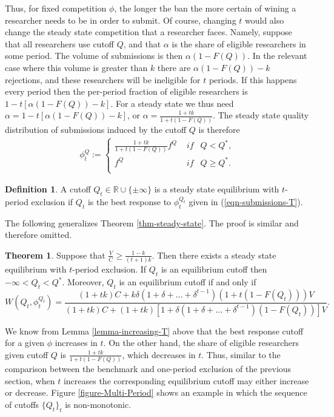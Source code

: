 \documentclass[12pt]{article}
\theoremstyle{plain}
\theoremstyle{definition}
\newtheorem{theorem}{Theorem}
\newtheorem{definition}{Definition}
\theoremstyle{remark}
\def\RR{\mathbb{R}}
\begin{document}
Thus, for fixed competition $\phi$, the longer the ban the more certain of wining a researcher needs to be in order to submit. Of course, changing $t$ would also change the steady state competition that a researcher faces. Namely, suppose that all researchers use cutoff $Q$, and that $\alpha$ is the share of eligible researchers in some period. The volume of submissions is then $\alpha(1-F(Q))$. In the relevant case where this volume is greater than $k$ there are $\alpha(1-F(Q))-k$ rejections, and these researchers will be ineligible for $t$ periods. If this happens every period then the per-period fraction of eligible researchers is $1-t[\alpha(1-F(Q))-k]$. For a steady state we thus need $\alpha = 1-t[\alpha(1-F(Q))-k]$, or $\alpha=\frac{1+tk}{1+t(1-F(Q))}$. The steady state quality distribution of submissions induced by the cutoff $Q$ is therefore  
\begin{eqnarray}\label{eqn-submissions-T}
\phi_t^Q:=
\left\{ \begin{array}{ll}
\frac{1+tk}{1+t(1-F(Q))}f^Q & \textit{ if } ~~ Q <Q^*,\\
f^Q & \textit{ if } ~~Q \ge Q^*.\\
\end{array} \right.
\end{eqnarray}

\begin{definition}\label{def-eq-with-bans-T}
A cutoff $Q_t\in \RR \cup \{\pm \infty\}$ is a steady state equilibrium with $t$-period exclusion if $Q_t$ is the best response to $\phi_t^{Q_t}$ given in (\ref{eqn-submissions-T}).
\end{definition}

The following generalizes Theorem \ref{thm-steady-state}. The proof is similar and therefore omitted.

\begin{theorem}\label{thm-steady-state-T}
    Suppose that $\frac{V}{C}\ge \frac{1-k}{(t+1)k}$. Then there exists a steady state equilibrium with $t$-period exclusion. If $Q_t$ is an equilibrium cutoff then $-\infty<Q_t<Q^*$. Moreover, $Q_t$ is an equilibrium cutoff if and only if
    \begin{equation}\label{eqn-steady-state-eq-T}
    W(Q_t,\phi^{Q_t}_t)= \frac{(1+tk)C+k\delta(1+\delta+\ldots+\delta^{t-1}) (1+t(1-F(Q_t)))V}{(1+tk)C+(1+tk)[1+\delta(1+\delta+\ldots+\delta^{t-1})(1-F(Q_t))]V}.
    \end{equation}     
\end{theorem}

We know from Lemma \ref{lemma-increasing-T} above that the best response cutoff for a given $\phi$ increases in $t$. On the other hand, the share of eligible researchers given cutoff $Q$ is $\frac{1+tk}{1+t(1-F(Q))}$, which decreases in $t$. Thus, similar to the comparison between the benchmark and one-period exclusion of the previous section, when $t$ increases the corresponding equilibrium cutoff may either increase or decrease. Figure \ref{figure-Multi-Period} shows an example in which the sequence of cutoffs $\{Q_t\}_t$ is non-monotonic.
\end{document}
